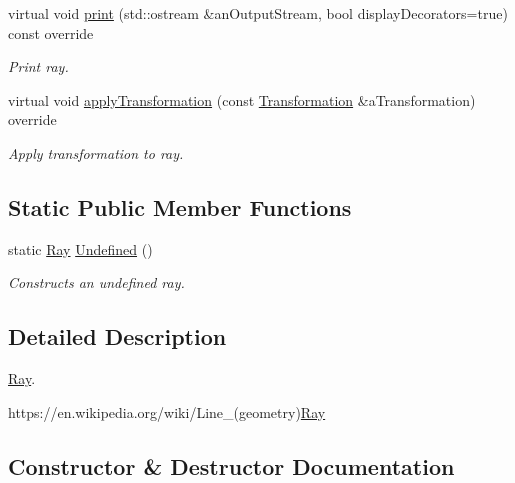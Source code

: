 \begin{DoxyCompactItemize}
virtual void \hyperlink{classlibrary_1_1math_1_1geom_1_1d3_1_1objects_1_1_ray_a2140183dca4c36f5c51ed9e8f2cd220d}{print} (std\+::ostream \&an\+Output\+Stream, bool display\+Decorators=true) const override
\begin{DoxyCompactList}\small\item\em Print ray. \end{DoxyCompactList}\item 
virtual void \hyperlink{classlibrary_1_1math_1_1geom_1_1d3_1_1objects_1_1_ray_a0dd177a924978e1817a9fa888594e694}{apply\+Transformation} (const \hyperlink{classlibrary_1_1math_1_1geom_1_1d3_1_1_transformation}{Transformation} \&a\+Transformation) override
\begin{DoxyCompactList}\small\item\em Apply transformation to ray. \end{DoxyCompactList}\end{DoxyCompactItemize}
\subsection*{Static Public Member Functions}
\begin{DoxyCompactItemize}
\item 
static \hyperlink{classlibrary_1_1math_1_1geom_1_1d3_1_1objects_1_1_ray}{Ray} \hyperlink{classlibrary_1_1math_1_1geom_1_1d3_1_1objects_1_1_ray_abf40bfaeab9e9024fd1fc73893da09e0}{Undefined} ()
\begin{DoxyCompactList}\small\item\em Constructs an undefined ray. \end{DoxyCompactList}\end{DoxyCompactItemize}


\subsection{Detailed Description}
\hyperlink{classlibrary_1_1math_1_1geom_1_1d3_1_1objects_1_1_ray}{Ray}. 

https\+://en.wikipedia.\+org/wiki/\+Line\+\_\+(geometry)\hyperlink{classlibrary_1_1math_1_1geom_1_1d3_1_1objects_1_1_ray_a11b7613464daaebc6e25a758b057f203}{Ray} 

\subsection{Constructor \& Destructor Documentation}
\mbox{\label{classlibrary_1_1math_1_1geom_1_1d3_1_1objects_1_1_ray_a11b7613464daaebc6e25a758b057f203}} 
